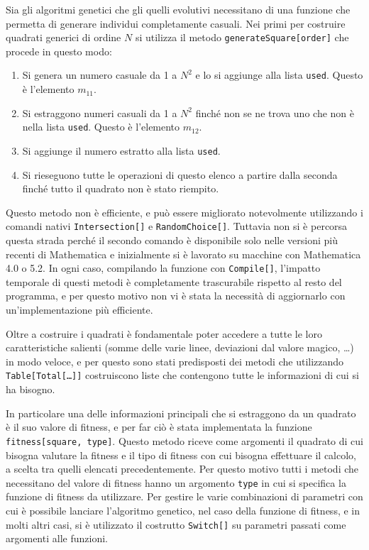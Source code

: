 \documentclass[italian,twoside,twocolumn]{article}
\begin{document}
Sia gli algoritmi genetici che gli quelli evolutivi necessitano di una funzione che permetta di generare individui completamente casuali. Nei primi per costruire quadrati generici di ordine $ N $ si utilizza il metodo \texttt{generateSquare[order]} che procede in questo modo: 
\begin{enumerate}
	\item Si genera un numero casuale da 1 a $ N^2 $ e lo si aggiunge alla lista \texttt{used}. Questo è l'elemento $ m_{11} $.
	\item Si estraggono numeri casuali da 1 a $ N^2 $ finché non se ne trova uno che non è nella lista \texttt{used}. Questo è l'elemento $ m_{12} $. 
	\item Si aggiunge il numero estratto alla lista \texttt{used}.
	\item Si rieseguono tutte le operazioni di questo elenco a partire dalla seconda finché tutto il quadrato non è stato riempito. 
\end{enumerate}
Questo metodo non è efficiente, e può essere migliorato notevolmente utilizzando i comandi nativi \texttt{Intersection[]} e \texttt{RandomChoice[]}. Tuttavia non si è percorsa questa strada perché il secondo comando è disponibile solo nelle versioni più recenti di Mathematica e inizialmente si è lavorato su macchine con Mathematica 4.0 o 5.2. In ogni caso, compilando la funzione con \texttt{Compile[]}, l'impatto temporale di questi metodi è completamente trascurabile rispetto al resto del programma, e per questo motivo non vi è stata la necessità di aggiornarlo con un'implementazione più efficiente.

Oltre a costruire i quadrati è fondamentale poter accedere a tutte le loro caratteristiche salienti (somme delle varie linee, deviazioni dal valore magico, \dots) in modo veloce, e per questo sono stati predisposti dei metodi che utilizzando \texttt{Table[Total[\dots]]} costruiscono liste che contengono tutte le informazioni di cui si ha bisogno.
	
In particolare una delle informazioni principali che si estraggono da un quadrato è il suo valore di fitness, e per far ciò è stata implementata la funzione \texttt{fitness[square, type]}. Questo metodo riceve come argomenti il quadrato di cui bisogna valutare la fitness e il tipo di fitness con cui bisogna effettuare il calcolo, a scelta tra quelli elencati precedentemente. Per questo motivo tutti i metodi che necessitano del valore di fitness hanno un argomento \texttt{type} in cui si specifica la funzione di fitness da utilizzare. Per gestire le varie combinazioni di parametri con cui è possibile lanciare l'algoritmo genetico, nel caso della funzione di fitness, e in molti altri casi, si è utilizzato il costrutto \texttt{Switch[]} su parametri passati come argomenti alle funzioni. 
\end{document}
